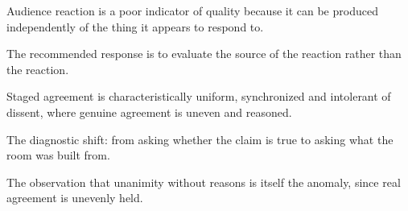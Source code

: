 

\begin{distilled}
  \item Audience reaction is a poor indicator of quality because it can be produced independently of the thing it appears to respond to.
  \item The recommended response is to evaluate the source of the reaction rather than the reaction.
  \item Staged agreement is characteristically uniform, synchronized and intolerant of dissent, where genuine agreement is uneven and reasoned.
\end{distilled}

\begin{unique}
  \item The diagnostic shift: from asking whether the claim is true to asking what the room was built from.
  \item The observation that unanimity without reasons is itself the anomaly, since real agreement is unevenly held.
\end{unique}
